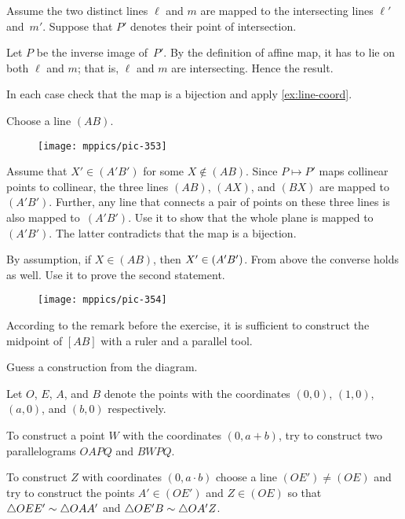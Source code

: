 Assume the two distinct lines $\ell$ and $m$ 
are mapped to the intersecting lines $\ell'$ and~$m'$.
Suppose that $P'$ denotes their point of intersection.

Let $P$ be the inverse image of~$P'$.
By the definition of affine map, it has to lie on both $\ell$ and $m$;
that is, $\ell$ and $m$ are intersecting.
Hence the result.

In each case check that the map is a bijection and apply \ref{ex:line-coord}.

Choose a line $(AB)$.

\begin{wrapfigure}{o}{20mm}
\vskip-0mm
\centering
\texttt{[image: mppics/pic-353]}
\end{wrapfigure}

Assume that $X'\in (A'B')$ for some $X\notin(AB)$.
Since $P\mapsto P'$ maps collinear points to collinear, 
the three lines $(AB)$, $(AX)$, and $(BX)$ are mapped to~$(A'B')$.
Further, any line that connects a pair of points on these three lines is also mapped to~$(A'B')$.
Use it to show that the whole plane is mapped to $(A'B')$.
The latter contradicts that the map is a bijection.

By assumption, if $X\in (AB)$, then $X'\z\in (A'B')$.
From above the converse holds as well.
Use it to prove the second statement.

{

\begin{wrapfigure}{r}{30mm}
\vskip-0mm
\centering
\texttt{[image: mppics/pic-354]}
\end{wrapfigure}

According to the remark before the exercise,
it is sufficient to construct the midpoint of $[AB]$
with a ruler and a parallel tool.

Guess a construction from the diagram.

Let $O$, $E$, $A$, and $B$ denote the points with the coordinates $(0,0)$, $(1,0)$, $(a,0)$, and $(b,0)$ respectively.

To construct a point $W$ with the coordinates $(0,a+b)$, try to construct two parallelograms $OAPQ$ and $BWPQ$.

}

To construct $Z$ with coordinates $(0,a\cdot b)$
choose a line $(OE')\ne (OE)$
and try to construct the points $A'\in (OE')$
and $Z \in(OE)$
so that 
$\triangle OEE'\z\sim \triangle OAA'$ and $\triangle OE'B\z\sim \triangle OA'Z$.

